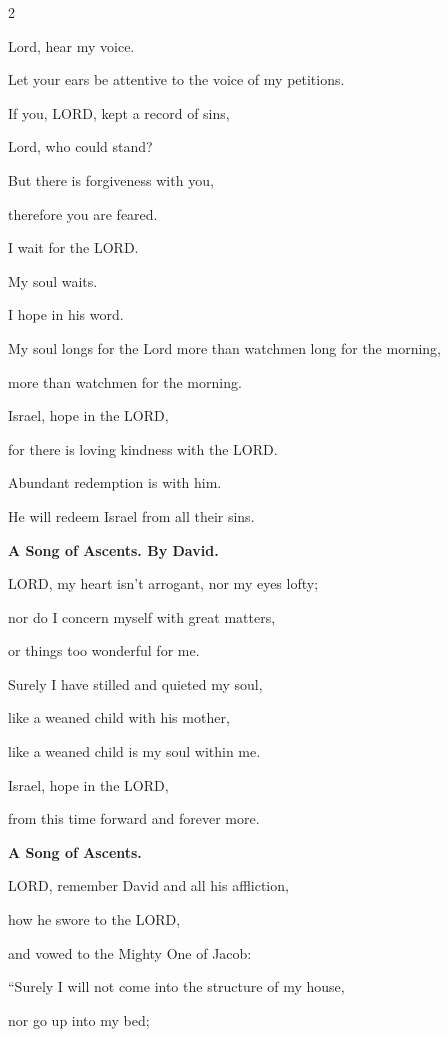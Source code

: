 \begin{multicols}{2}
	
	\myverse{}Lord, hear my voice.
	
	Let your ears be attentive to the voice of my petitions.
	
	
	\myverse{}If you, LORD, kept a record of sins,
	
	Lord, who could stand?
	
	
	\myverse{}But there is forgiveness with you,
	
	therefore you are feared.
	
	
	\myverse{}I wait for the LORD.
	
	My soul waits.
	
	I hope in his word.
	
	
	\myverse{}My soul longs for the Lord more than watchmen long for the morning,
	
	more than watchmen for the morning.
	
	
	\myverse{}Israel, hope in the LORD,
	
	for there is loving kindness with the LORD.
	
	Abundant redemption is with him.
	
	
	\myverse{}He will redeem Israel from all their sins.
	
	
	\mychapter{}\textbf{A Song of Ascents. By David.}
	
	\quad\quad\quad \myverse*{}LORD, my heart isn’t arrogant, nor my eyes lofty;
	
	nor do I concern myself with great matters,
	
	or things too wonderful for me.
	
	
	\myverse{}Surely I have stilled and quieted my soul,
	
	like a weaned child with his mother,
	
	like a weaned child is my soul within me.
	
	
	\myverse{}Israel, hope in the LORD,
	
	from this time forward and forever more.
	
	
	\mychapter{}\textbf{A Song of Ascents.}
	
	\quad\quad\quad \myverse*{}LORD, remember David and all his affliction,
	
	
	\myverse{}how he swore to the LORD,
	
	and vowed to the Mighty One of Jacob:
	
	
	\myverse{}“Surely I will not come into the structure of my house,
	
	nor go up into my bed;
	

\end{multicols}

